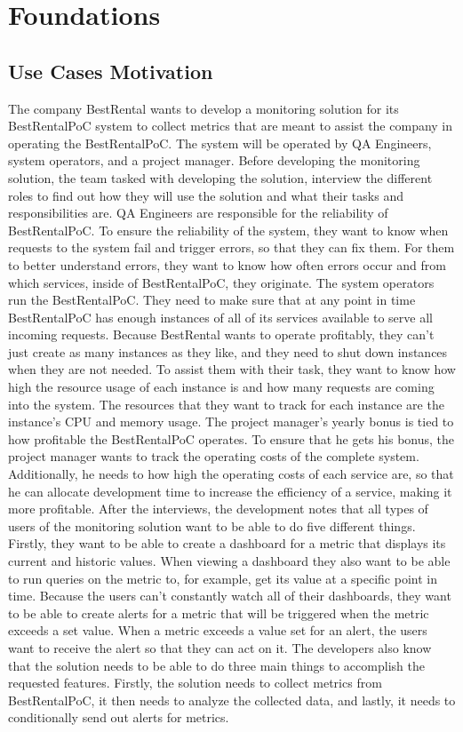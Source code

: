 \chapter{Foundations}
\label{cha:foundations}

\section{Use Cases Motivation}

The company BestRental wants to develop a monitoring solution for its BestRentalPoC system
to collect metrics that are meant to assist the company in operating the BestRentalPoC.
The system will be operated by QA Engineers, system operators, and a project manager.
Before developing the monitoring solution, the team tasked with developing the solution,
interview the different roles to find out how they will use the solution
and what their tasks and responsibilities are.
QA Engineers are responsible for the reliability of BestRentalPoC.
To ensure the reliability of the system, they want to know when requests to the system fail and
trigger errors, so that they can fix them.
For them to better understand errors, they want to know how often errors occur and from which services,
inside of BestRentalPoC, they originate.
The system operators run the BestRentalPoC. They need to make sure that at any point in time
BestRentalPoC has enough instances of all of its services available to serve all incoming requests.
Because BestRental wants to operate profitably, they can't just create as many instances as they like,
and they need to shut down instances when they are not needed.
To assist them with their task, they want to know how high the resource usage of each instance is
and how many requests are coming into the system. The resources that they want to track for each
instance are the instance's CPU and memory usage.
The project manager's yearly bonus is tied to how profitable the BestRentalPoC operates.
To ensure that he gets his bonus, the project manager wants to track the operating costs of the complete system.
Additionally, he needs to how high the operating costs of each service are, so that he can
allocate development time to increase the efficiency of a service, making it more profitable.
After the interviews, the development notes that all types of users of the monitoring solution
want to be able to do five different things.
Firstly, they want to be able to create a dashboard for a metric that displays its current and historic values.
When viewing a dashboard they also want to be able to run queries on the metric to, for example, get
its value at a specific point in time.
Because the users can't constantly watch all of their dashboards, they want to be able to create
alerts for a metric that will be triggered when the metric exceeds a set value.
When a metric exceeds a value set for an alert, the users want to receive the alert so that they can act on it.
The developers also know that the solution needs to be able to do three main things to accomplish
the requested features.
Firstly, the solution needs to collect metrics from BestRentalPoC,
it then needs to analyze the collected data, and lastly, it needs to conditionally send out alerts
for metrics.

